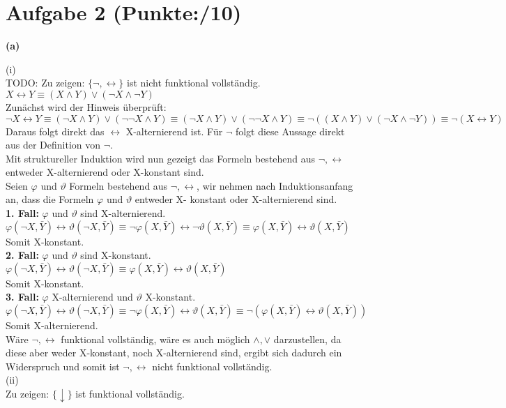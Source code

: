 \documentclass[11pt, a4paper]{article}
\newcommand{\p}{10}
\begin{document}
\section*{Aufgabe 2 (Punkte:\qquad/\p)}
\textbf{(a)}
\begin{adjustwidth}{20pt}{20pt}
(i)\\
TODO: Zu zeigen: $\{\neg , \leftrightarrow \}$ ist nicht funktional vollständig.\\
$X \leftrightarrow Y \equiv (X \wedge Y) \vee (\neg X \wedge \neg Y ) $\\ 
Zunächst wird der Hinweis überprüft:\\
$\neg X \leftrightarrow Y \equiv ( \neg X \wedge Y) \vee ( \neg \neg X \wedge Y) \equiv ( 
\neg X \wedge Y) \vee ( \neg \neg X \wedge Y) \equiv \neg ((X \wedge Y) \vee (\neg X
\wedge \neg Y )) \equiv \neg ( X \leftrightarrow Y ) $\\
Daraus folgt direkt das $\leftrightarrow$ X-alternierend ist. Für $\neg$ folgt diese
Aussage direkt aus der Definition von $\neg$.\\
Mit struktureller Induktion wird nun gezeigt das Formeln bestehend aus ${ \neg ,
\leftrightarrow}$ entweder X-alternierend oder X-konstant sind.\\
Seien $\varphi$ und $\vartheta$ Formeln bestehend aus ${\neg ,\leftrightarrow}$, wir
nehmen nach Induktionsanfang an, dass die Formeln $\varphi$ und $\vartheta$ entweder X-
konstant oder X-alternierend sind.\\
\textbf{1. Fall:} $\varphi$ und $\vartheta$ sind X-alternierend.\\
 $ \varphi (\neg X , \bar{Y} ) \leftrightarrow \vartheta (\neg X , \bar{Y} )  \equiv  \neg \varphi( X , \bar{Y} ) \leftrightarrow \neg \vartheta( X , \bar{Y} ) \equiv  \varphi ( X , \bar{Y} ) \leftrightarrow \vartheta ( X , \bar{Y} ) $\\
Somit X-konstant.\\
\textbf{2. Fall:} $\varphi$ und $\vartheta$ sind X-konstant.\\
 $ \varphi (\neg X , \bar{Y} ) \leftrightarrow \vartheta (\neg X , \bar{Y} )  \equiv   \varphi( X , \bar{Y} ) \leftrightarrow  \vartheta( X , \bar{Y} ) $\\
Somit X-konstant.\\
 \textbf{3. Fall:} $\varphi$ X-alternierend und $\vartheta$ X-konstant.\\
 $ \varphi (\neg X , \bar{Y} ) \leftrightarrow \vartheta (\neg X , \bar{Y} )  \equiv   \neg \varphi( X , \bar{Y} ) \leftrightarrow \vartheta( X , \bar{Y} ) \equiv   \neg (\varphi ( X , \bar{Y} ) \leftrightarrow \vartheta ( X , \bar{Y} )) $\\
Somit X-alternierend.\\
 Wäre ${ \neg , \leftrightarrow} $ funktional vollständig, wäre es auch möglich ${\wedge , \vee}$ darzustellen, da diese aber weder X-konstant, noch X-alternierend sind, ergibt sich dadurch ein Widerspruch und somit ist ${ \neg , \leftrightarrow} $ nicht funktional vollständig.\\
(ii)\\
Zu zeigen: $\{\downarrow\}$ ist funktional vollständig.\\


\end{adjustwidth}
\end{document}
